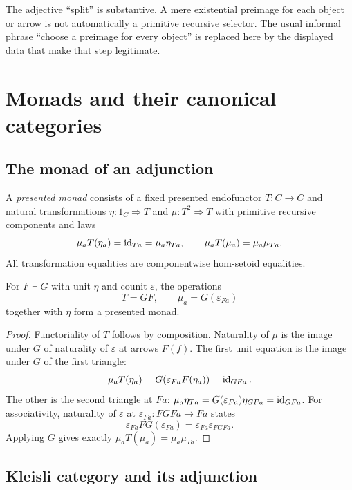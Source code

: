The adjective ``split'' is substantive.  A mere existential preimage for
each object or arrow is not automatically a primitive recursive selector.
The usual informal phrase ``choose a preimage for every object'' is replaced
here by the displayed data that make that step legitimate.

\section{Monads and their canonical categories}\label{sec:monads}

\subsection{The monad of an adjunction}

A \emph{presented monad} consists of a fixed presented endofunctor $T:C\to C$
and natural transformations $\eta:1_C\Rightarrow T$ and
$\mu:T^2\Rightarrow T$ with primitive recursive components and laws
\[
 \mu_aT(\eta_a)=\operatorname{id}_{Ta}=\mu_a\eta_{Ta},\qquad
 \mu_aT(\mu_a)=\mu_a\mu_{Ta}.
\]
All transformation equalities are componentwise hom-setoid equalities.

\begin{theorem}
For $F\dashv G$ with unit $\eta$ and counit $\varepsilon$, the operations
\[
 T=GF,\qquad \mu_a=G(\varepsilon_{Fa})
\]
together with $\eta$ form a presented monad.
\end{theorem}
\begin{proof}
Functoriality of $T$ follows by composition.  Naturality of $\mu$ is the
image under $G$ of naturality of $\varepsilon$ at arrows $F(f)$.
The first unit equation is the image under $G$ of the first triangle:
\[
 \mu_aT(\eta_a)=G(\varepsilon_{Fa}F(\eta_a))=\operatorname{id}_{GFa}.
\]
The other is the second triangle at $Fa$:
$\mu_a\eta_{Ta}=G(\varepsilon_{Fa})\eta_{GFa}=\operatorname{id}_{GFa}$.
For associativity, naturality of $\varepsilon$ at
$\varepsilon_{Fa}:FGFa\to Fa$ states
\[
 \varepsilon_{Fa}FG(\varepsilon_{Fa})
 =\varepsilon_{Fa}\varepsilon_{FGFa}.
\]
Applying $G$ gives exactly $\mu_aT(\mu_a)=\mu_a\mu_{Ta}$.
\end{proof}

\subsection{Kleisli category and its adjunction}

